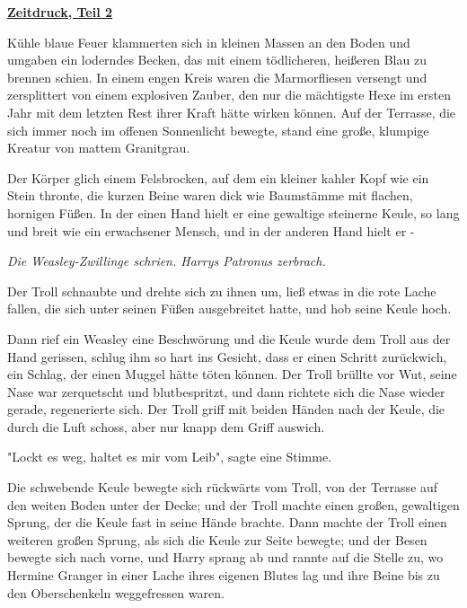 

\hypertarget{zeitdruck-teil-2}{%

\textbf{\uline{Zeitdruck, Teil 2}}

Kühle blaue Feuer klammerten sich in kleinen Massen an den Boden und umgaben ein loderndes Becken, das mit einem tödlicheren, heißeren Blau zu brennen schien. In einem engen Kreis waren die Marmorfliesen versengt und zersplittert von einem explosiven Zauber, den nur die mächtigste Hexe im ersten Jahr mit dem letzten Rest ihrer Kraft hätte wirken können. Auf der Terrasse, die sich immer noch im offenen Sonnenlicht bewegte, stand eine große, klumpige Kreatur von mattem Granitgrau.

Der Körper glich einem Felsbrocken, auf dem ein kleiner kahler Kopf wie ein Stein thronte, die kurzen Beine waren dick wie Baumstämme mit flachen, hornigen Füßen. In der einen Hand hielt er eine gewaltige steinerne Keule, so lang und breit wie ein erwachsener Mensch, und in der anderen Hand hielt er -

\emph{Die Weasley-Zwillinge schrien. Harrys Patronus zerbrach.}

Der Troll schnaubte und drehte sich zu ihnen um, ließ etwas in die rote Lache fallen, die sich unter seinen Füßen ausgebreitet hatte, und hob seine Keule hoch.

Dann rief ein Weasley eine Beschwörung und die Keule wurde dem Troll aus der Hand gerissen, schlug ihm so hart ins Gesicht, dass er einen Schritt zurückwich, ein Schlag, der einen Muggel hätte töten können. Der Troll brüllte vor Wut, seine Nase war zerquetscht und blutbespritzt, und dann richtete sich die Nase wieder gerade, regenerierte sich. Der Troll griff mit beiden Händen nach der Keule, die durch die Luft schoss, aber nur knapp dem Griff auswich.

"Lockt es weg, haltet es mir vom Leib", sagte eine Stimme.

Die schwebende Keule bewegte sich rückwärts vom Troll, von der Terrasse auf den weiten Boden unter der Decke; und der Troll machte einen großen, gewaltigen Sprung, der die Keule fast in seine Hände brachte. Dann machte der Troll einen weiteren großen Sprung, als sich die Keule zur Seite bewegte; und der Besen bewegte sich nach vorne, und Harry sprang ab und rannte auf die Stelle zu, wo Hermine Granger in einer Lache ihres eigenen Blutes lag und ihre Beine bis zu den Oberschenkeln weggefressen waren.

}
